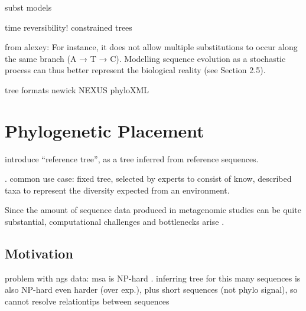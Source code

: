 subst models

time reversibility!
constrained trees

from alexey:
For instance, it does not allow multiple substitutions to occur
along the same branch (A → T → C). Modelling sequence evolution as a stochastic
process can thus better represent the biological reality (see Section 2.5).

tree formats
newick \cite{Archie1986}
NEXUS \cite{Maddison1997}
phyloXML \cite{Han2009}


\section{Phylogenetic Placement}
\label{ch:Foundations:sec:PhylogeneticPlacement}

introduce ``reference tree'', as a tree inferred from reference sequences.

. common use case: fixed tree, selected by experts to consist of know, described taxa
to represent the diversity expected from an environment.


Since the amount of sequence data produced in metagenomic studies can be quite substantial,
computational challenges and bottlenecks arise \cite{Scholz2012}.



\subsection{Motivation}
\label{ch:Foundations:sec:PhylogeneticPlacement:sub:Motivation}


problem with ngs data:
msa is NP-hard \cite{Just2001}.
inferring tree for this many sequences is also NP-hard \cite{Chor2005} even harder (over exp.), plus
short sequences (not phylo signal), so cannot resolve relationtips between sequences


